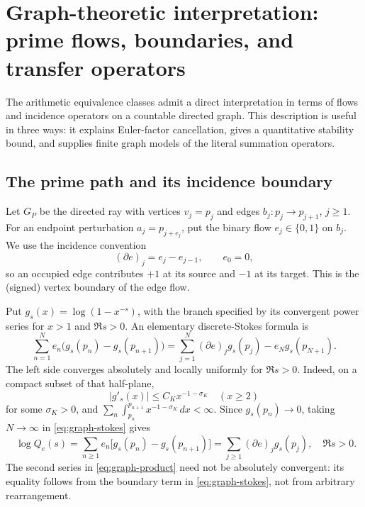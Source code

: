 
\section{Graph-theoretic interpretation: prime flows, boundaries, and transfer operators}
\label{sec:prime-graphs}

The arithmetic equivalence classes admit a direct interpretation in terms of
flows and incidence operators on a countable directed graph.  This description
is useful in three ways: it explains Euler-factor cancellation, gives a
quantitative stability bound, and supplies finite graph models of the
literal summation operators.

\subsection{The prime path and its incidence boundary}

Let \(G_P\) be the directed ray with vertices \(v_j=p_j\) and edges
\(b_j:p_j\to p_{j+1}\), \(j\ge1\).  For an endpoint perturbation
\(a_j=p_{j+e_j}\), put the binary flow \(e_j\in\{0,1\}\) on \(b_j\).
We use the incidence convention
\[
 (\partial e)_j=e_j-e_{j-1},\qquad e_0=0,
\]
so an occupied edge contributes \(+1\) at its source and \(-1\) at its
target.  This is the (signed) vertex boundary of the edge flow.

\begin{center}
\end{center}

Put \(g_s(x)=\log(1-x^{-s})\), with the branch specified by its
convergent power series for \(x>1\) and \(\Re s>0\).
An elementary discrete-Stokes formula is
\begin{equation}\label{eq:graph-stokes}
 \sum_{n=1}^{N}e_n\bigl(g_s(p_n)-g_s(p_{n+1})\bigr)
 =\sum_{j=1}^{N}(\partial e)_j g_s(p_j)
       -e_Ng_s(p_{N+1}).
\end{equation}
The left side converges absolutely and locally uniformly for \(\Re s>0\).
Indeed, on a compact subset of that half-plane,
\[
 |g'_s(x)|\le C_K x^{-1-\sigma_K}\quad(x\ge2)
\]
for some \(\sigma_K>0\), and
\(\sum_n\int_{p_n}^{p_{n+1}}x^{-1-\sigma_K}\,dx<\infty\).
Since \(g_s(p_n)\to0\), taking \(N\to\infty\) in
\eqref{eq:graph-stokes} gives
\begin{equation}\label{eq:graph-product}
 \boxed{\quad
 \log Q_e(s)
 =\sum_{n\ge1}e_n\bigl[g_s(p_n)-g_s(p_{n+1})\bigr]
 =\sum_{j\ge1}(\partial e)_j g_s(p_j),\quad \Re s>0.
 \quad}
\end{equation}
The second series in \eqref{eq:graph-product} need not be absolutely
convergent: its equality follows from the boundary term in
\eqref{eq:graph-stokes}, not from arbitrary rearrangement.

